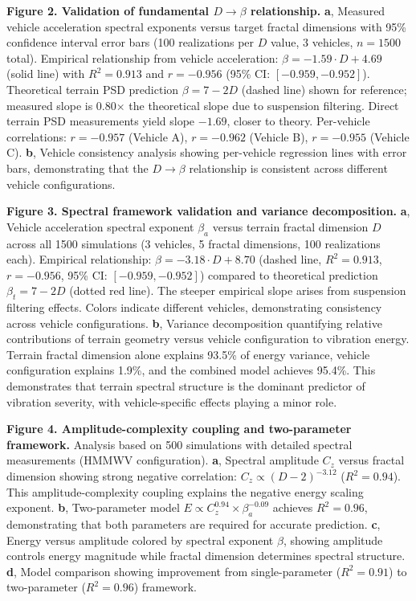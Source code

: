 \documentclass[11pt]{article}
\begin{document}
\textbf{Figure 2. Validation of fundamental $D \rightarrow \beta$ relationship.} 
\textbf{a}, Measured vehicle acceleration spectral exponents versus target fractal dimensions with 95\% confidence interval error bars (100 realizations per $D$ value, 3 vehicles, $n=1500$ total). Empirical relationship from vehicle acceleration: $\beta = -1.59 \cdot D + 4.69$ (solid line) with $R^2 = 0.913$ and $r = -0.956$ (95\% CI: $[-0.959, -0.952]$). Theoretical terrain PSD prediction $\beta = 7-2D$ (dashed line) shown for reference; measured slope is 0.80× the theoretical slope due to suspension filtering. Direct terrain PSD measurements yield slope $-1.69$, closer to theory. Per-vehicle correlations: $r = -0.957$ (Vehicle A), $r = -0.962$ (Vehicle B), $r = -0.955$ (Vehicle C).
\textbf{b}, Vehicle consistency analysis showing per-vehicle regression lines with error bars, demonstrating that the $D \rightarrow \beta$ relationship is consistent across different vehicle configurations.

\textbf{Figure 3. Spectral framework validation and variance decomposition.}
\textbf{a}, Vehicle acceleration spectral exponent $\beta_a$ versus terrain fractal dimension $D$ across all 1500 simulations (3 vehicles, 5 fractal dimensions, 100 realizations each). Empirical relationship: $\beta = -3.18 \cdot D + 8.70$ (dashed line, $R^2 = 0.913$, $r = -0.956$, 95\% CI: $[-0.959, -0.952]$) compared to theoretical prediction $\beta_t = 7 - 2D$ (dotted red line). The steeper empirical slope arises from suspension filtering effects. Colors indicate different vehicles, demonstrating consistency across vehicle configurations.
\textbf{b}, Variance decomposition quantifying relative contributions of terrain geometry versus vehicle configuration to vibration energy. Terrain fractal dimension alone explains 93.5\% of energy variance, vehicle configuration explains 1.9\%, and the combined model achieves 95.4\%. This demonstrates that terrain spectral structure is the dominant predictor of vibration severity, with vehicle-specific effects playing a minor role.


\textbf{Figure 4. Amplitude-complexity coupling and two-parameter framework.} 
Analysis based on 500 simulations with detailed spectral measurements (HMMWV configuration). 
\textbf{a}, Spectral amplitude $C_z$ versus fractal dimension showing strong negative correlation: $C_z \propto (D-2)^{-3.12}$ ($R^2 = 0.94$). This amplitude-complexity coupling explains the negative energy scaling exponent. 
\textbf{b}, Two-parameter model $E \propto C_z^{0.94} \times \beta_a^{-0.09}$ achieves $R^2 = 0.96$, demonstrating that both parameters are required for accurate prediction. 
\textbf{c}, Energy versus amplitude colored by spectral exponent $\beta$, showing amplitude controls energy magnitude while fractal dimension determines spectral structure. 
\textbf{d}, Model comparison showing improvement from single-parameter ($R^2 = 0.91$) to two-parameter ($R^2 = 0.96$) framework.
\end{document}
